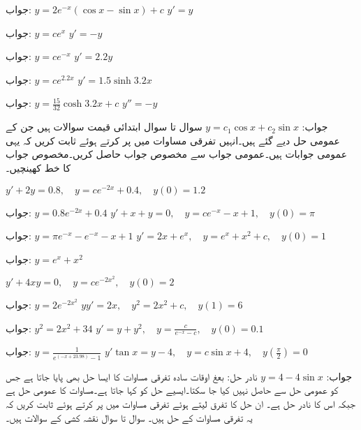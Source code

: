 جواب:\quad
 $y=2e^{-x}(\cos x-\sin x)+c$
\quad
$y'=y$

جواب:\quad
$y=ce^{x}$
\quad
$y'=-y$

جواب:\quad
$y=ce^{-x}$
\quad
$y'=2.2y$

جواب:\quad
$y=ce^{2.2x}$
\quad
$y'=1.5\sinh 3.2x$

جواب:\quad
$y=\tfrac{15}{32}\cosh 3.2x+c$
\quad
$y''=-y$

جواب:\quad
$y=c_1\cos x+c_2\sin x$
سوال  تا سوال  ابتدائی قیمت سوالات ہیں جن کے عمومی حل دیے گئے ہیں۔انہیں تفرقی مساوات میں پر کرتے ہوئے ثابت کریں کہ یہی عمومی جوابات ہیں۔عمومی جواب سے مخصوص جواب حاصل کریں۔مخصوص جواب کا خط کھینچیں۔

\quad
$y'+2y=0.8,\quad y=ce^{-2x}+0.4,\quad y(0)=1.2$

جواب:\quad
$y=0.8e^{-2x}+0.4$
\quad
$y'+x+y=0,\quad y=ce^{-x}-x+1,\quad y(0)=\pi$

جواب:\quad
$y=\pi e^{-x}-e^{-x}-x+1$
\quad
$y'=2x+e^{x},\quad y=e^{x}+x^2+c,\quad y(0)=1$

جواب:\quad
$y=e^{x}+x^2$


\quad
$y'+4xy=0,\quad y=ce^{-2x^2},\quad y(0)=2$

جواب:\quad
$y=2e^{-2x^2}$
\quad
$yy'=2x,\quad y^2=2x^2+c,\quad y(1)=6$

جواب:\quad
$y^2=2x^2+34$
\quad
$y'=y+y^2,\quad y=\tfrac{c}{e^{-x}-c},\quad y(0)=0.1$

جواب:\quad
$y=\tfrac{1}{e^{(-x+23.98)}-1}$
\quad
$y'\tan x=y-4,\quad y=c\sin x+4,\quad y(\tfrac{\pi}{2})=0$

جواب:\quad
$y=4-4\sin x$
نادر حل: بعغ اوقات سادہ تفرقی مساوات کا ایسا حل بھی پایا جاتا ہے جس کو عمومی حل سے حاصل نہیں کیا جا سکتا۔ایسیے حل کو  کہا جاتا ہے۔مساوات  کا عمومی حل  ہے جبکہ اس کا  نادر حل  ہے۔ ان حل کا تفرق لیتے ہوئے تفرقی مساوات میں پر کرتے ہوئے ثابت کریں کہ یہ تفرقی مساوات کے حل ہیں۔
سوال  تا سوال  نقشہ کشی کے سوالات ہیں۔

